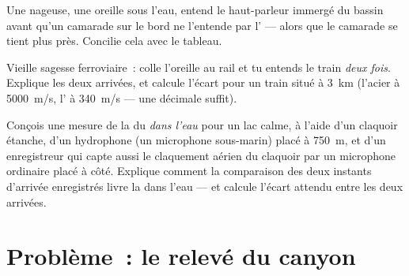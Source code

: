 \begin{exercise}[$\star\star$]\label{exo:g7:sound-production:10}
Une nageuse, une oreille sous l'eau, entend le haut-parleur immergé
du bassin avant qu'un camarade sur le bord ne l'entende par l' ---
alors que le camarade se tient plus près. Concilie cela avec le
tableau.
\end{exercise}

\begin{exercise}[$\star\star$]\label{exo:g7:sound-production:11}
Vieille sagesse ferroviaire~: colle l'oreille au rail et tu entends
le train \emph{deux fois}. Explique les deux arrivées, et calcule
l'écart pour un train situé à \qty{3}{km} (l'acier à \qty{5000}{m/s},
l' à \qty{340}{m/s} --- une décimale suffit).
\end{exercise}

\begin{exercise}[$\star\star\star$]\label{exo:g7:sound-production:12}
Conçois une mesure de la  du  \emph{dans l'eau} pour un lac
calme, à l'aide d'un claquoir étanche, d'un hydrophone (un microphone
sous-marin) placé à \qty{750}{m}, et d'un enregistreur qui capte
aussi le claquement aérien du claquoir par un microphone ordinaire
placé à côté. Explique comment la comparaison des deux instants
d'arrivée enregistrés livre la  dans l'eau --- et calcule
l'écart attendu entre les deux arrivées.
\end{exercise}

\section{Problème~: le relevé du canyon}

